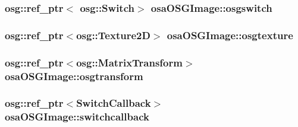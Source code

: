 \subsubsection[{osgswitch}]{\setlength{\rightskip}{0pt plus 5cm}osg\+::ref\+\_\+ptr$<$ osg\+::\+Switch$>$ osa\+O\+S\+G\+Image\+::osgswitch\hspace{0.3cm}{\ttfamily [protected]}}\label{classosa_o_s_g_image_ae0c39af6fbb02f9cecd27d9c464c43a5}
\hypertarget{classosa_o_s_g_image_aecdf8d95b41d0fd16155d38572394924}{}
\subsubsection[{osgtexture}]{\setlength{\rightskip}{0pt plus 5cm}osg\+::ref\+\_\+ptr$<$osg\+::\+Texture2\+D$>$ osa\+O\+S\+G\+Image\+::osgtexture\hspace{0.3cm}{\ttfamily [protected]}}\label{classosa_o_s_g_image_aecdf8d95b41d0fd16155d38572394924}
\hypertarget{classosa_o_s_g_image_ad1e17d08490c1a071a136779a6cff1ab}{}
\subsubsection[{osgtransform}]{\setlength{\rightskip}{0pt plus 5cm}osg\+::ref\+\_\+ptr$<$osg\+::\+Matrix\+Transform$>$ osa\+O\+S\+G\+Image\+::osgtransform\hspace{0.3cm}{\ttfamily [protected]}}\label{classosa_o_s_g_image_ad1e17d08490c1a071a136779a6cff1ab}
\hypertarget{classosa_o_s_g_image_a497dd33a14a175166968cb9509c87a73}{}
\subsubsection[{switchcallback}]{\setlength{\rightskip}{0pt plus 5cm}osg\+::ref\+\_\+ptr$<${\bf Switch\+Callback}$>$ osa\+O\+S\+G\+Image\+::switchcallback\hspace{0.3cm}{\ttfamily [protected]}}\label{classosa_o_s_g_image_a497dd33a14a175166968cb9509c87a73}
\hypertarget{classosa_o_s_g_image_a995c45a06441301f3a8845bc67621b89}{}

